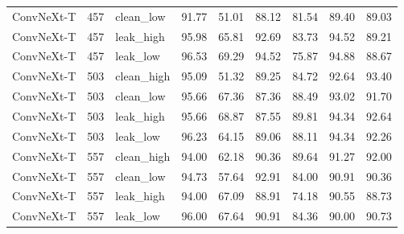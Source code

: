 {\begin{longtable}{lrlrrrrrr}
ConvNeXt-T & 457 & clean\_low & 91.77 & 51.01 & 88.12 & 81.54 & 89.40 & 89.03 \\
ConvNeXt-T & 457 & leak\_high & 95.98 & 65.81 & 92.69 & 83.73 & 94.52 & 89.21 \\
ConvNeXt-T & 457 & leak\_low & 96.53 & 69.29 & 94.52 & 75.87 & 94.88 & 88.67 \\
ConvNeXt-T & 503 & clean\_high & 95.09 & 51.32 & 89.25 & 84.72 & 92.64 & 93.40 \\
ConvNeXt-T & 503 & clean\_low & 95.66 & 67.36 & 87.36 & 88.49 & 93.02 & 91.70 \\
ConvNeXt-T & 503 & leak\_high & 95.66 & 68.87 & 87.55 & 89.81 & 94.34 & 92.64 \\
ConvNeXt-T & 503 & leak\_low & 96.23 & 64.15 & 89.06 & 88.11 & 94.34 & 92.26 \\
ConvNeXt-T & 557 & clean\_high & 94.00 & 62.18 & 90.36 & 89.64 & 91.27 & 92.00 \\
ConvNeXt-T & 557 & clean\_low & 94.73 & 57.64 & 92.91 & 84.00 & 90.91 & 90.36 \\
ConvNeXt-T & 557 & leak\_high & 94.00 & 67.09 & 88.91 & 74.18 & 90.55 & 88.73 \\
ConvNeXt-T & 557 & leak\_low & 96.00 & 67.64 & 90.91 & 84.36 & 90.00 & 90.73 \\
\end{longtable}
}
